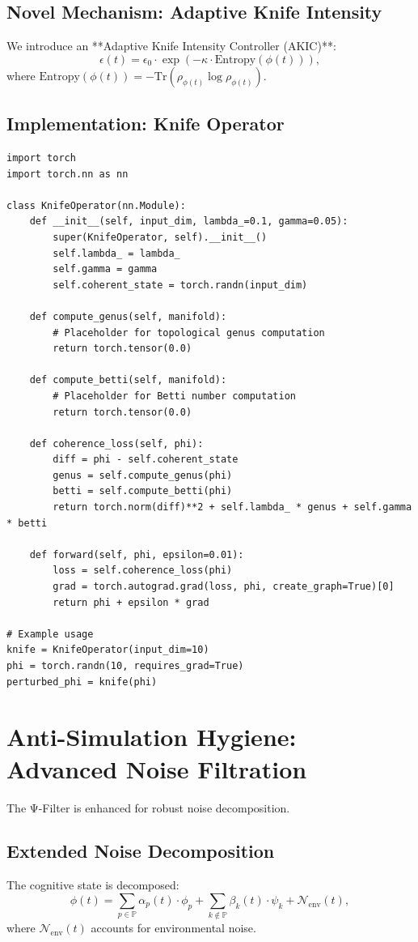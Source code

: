 \documentclass[12pt]{article}
\begin{document}
\subsection{Novel Mechanism: Adaptive Knife Intensity}
We introduce an **Adaptive Knife Intensity Controller (AKIC)**:
\[
\epsilon(t) = \epsilon_0 \cdot \exp\left(-\kappa \cdot \text{Entropy}(\phi(t))\right),
\]
where $\text{Entropy}(\phi(t)) = -\text{Tr}(\rho_{\phi(t)} \log \rho_{\phi(t)})$.

\subsection{Implementation: Knife Operator}
\begin{verbatim}
import torch
import torch.nn as nn

class KnifeOperator(nn.Module):
    def __init__(self, input_dim, lambda_=0.1, gamma=0.05):
        super(KnifeOperator, self).__init__()
        self.lambda_ = lambda_
        self.gamma = gamma
        self.coherent_state = torch.randn(input_dim)
    
    def compute_genus(self, manifold):
        # Placeholder for topological genus computation
        return torch.tensor(0.0)
    
    def compute_betti(self, manifold):
        # Placeholder for Betti number computation
        return torch.tensor(0.0)
    
    def coherence_loss(self, phi):
        diff = phi - self.coherent_state
        genus = self.compute_genus(phi)
        betti = self.compute_betti(phi)
        return torch.norm(diff)**2 + self.lambda_ * genus + self.gamma * betti
    
    def forward(self, phi, epsilon=0.01):
        loss = self.coherence_loss(phi)
        grad = torch.autograd.grad(loss, phi, create_graph=True)[0]
        return phi + epsilon * grad

# Example usage
knife = KnifeOperator(input_dim=10)
phi = torch.randn(10, requires_grad=True)
perturbed_phi = knife(phi)
\end{verbatim}

\section{Anti-Simulation Hygiene: Advanced Noise Filtration}
The Ψ-Filter is enhanced for robust noise decomposition.

\subsection{Extended Noise Decomposition}
The cognitive state is decomposed:
\[
\phi(t) = \sum_{p \in \mathbb{P}} \alpha_p(t) \cdot \phi_p + \sum_{k \notin \mathbb{P}} \beta_k(t) \cdot \psi_k + \mathcal{N}_{\text{env}}(t),
\]
where $\mathcal{N}_{\text{env}}(t)$ accounts for environmental noise.
\end{document}
